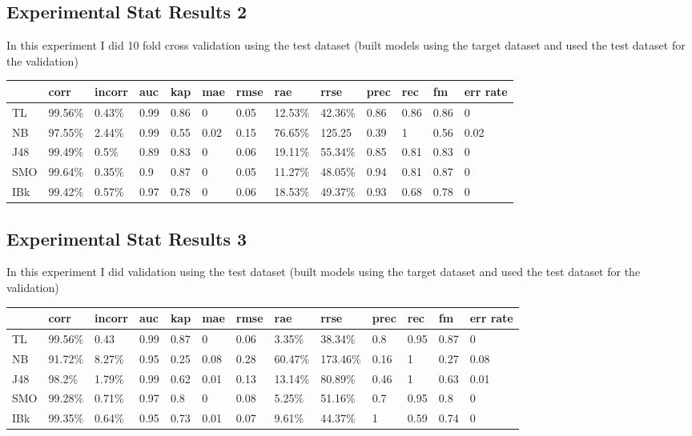 \documentclass[a4paper,12pt, english]{article}
\begin{document}
\subsection{Experimental Stat Results 2}
In this experiment I did 10 fold cross validation using the test dataset (built models using the target dataset and used the test dataset for the validation)
\begin{small}
\begin{center}
    \begin{tabular}{ | l | l | l | l | l | l | l | l | l | l | l | l | l |}
    \hline
& corr & incorr  & auc & kap & mae & rmse & rae & rrse & prec & rec & fm & err rate\\ \hline    
TL & 99.56\% & 0.43\% & 0.99 & 0.86 & 0 & 0.05 & 12.53\% & 42.36\% & 0.86 & 0.86 & 0.86 & 0\\ \hline
NB & 97.55\% & 2.44\% & 0.99 & 0.55 & 0.02 & 0.15 & 76.65\% & 125.25 & 0.39 & 1 & 0.56 & 0.02\\ \hline
J48 & 99.49\% & 0.5\% & 0.89 & 0.83 & 0 & 0.06 & 19.11\% & 55.34\% & 0.85 & 0.81 & 0.83 & 0\\ \hline
SMO & 99.64\% & 0.35\% & 0.9 & 0.87 & 0 & 0.05 & 11.27\% & 48.05\% & 0.94 & 0.81 & 0.87 & 0\\ \hline
IBk & 99.42\% & 0.57\% & 0.97 & 0.78 & 0 & 0.06 & 18.53\% & 49.37\% & 0.93 & 0.68 & 0.78 & 0\\ \hline      
    
    \end{tabular}       
\end{center}
\end{small}

\subsection{Experimental Stat Results 3}
In this experiment I did validation using the test dataset (built models using the target dataset and used the test dataset for the validation)
\begin{small}
\begin{center}
    \begin{tabular}{ | l | l | l | l | l | l | l | l | l | l | l | l | l |}
    \hline
& corr & incorr  & auc & kap & mae & rmse & rae & rrse & prec & rec & fm & err rate\\ \hline    
TL & 99.56\% & 0.43 & 0.99 & 0.87 & 0 & 0.06 & 3.35\% & 38.34\% & 0.8 & 0.95 & 0.87 & 0\\ \hline  
NB & 91.72\% & 8.27\% & 0.95 & 0.25 & 0.08 & 0.28 & 60.47\% & 173.46\% & 0.16 & 1 & 0.27 & 0.08\\ \hline  
J48 & 98.2\% & 1.79\% & 0.99 & 0.62 & 0.01 & 0.13 & 13.14\% & 80.89\% & 0.46 & 1 & 0.63 & 0.01\\ \hline  
SMO & 99.28\% & 0.71\% & 0.97 & 0.8 & 0 & 0.08 & 5.25\% & 51.16\% & 0.7 & 0.95 & 0.8 & 0\\ \hline  
IBk & 99.35\% & 0.64\% & 0.95 & 0.73 & 0.01 & 0.07 & 9.61\% & 44.37\% & 1 & 0.59 & 0.74 & 0 \\ \hline    
    
    \end{tabular}       
\end{center}
\end{small}
\end{document}
